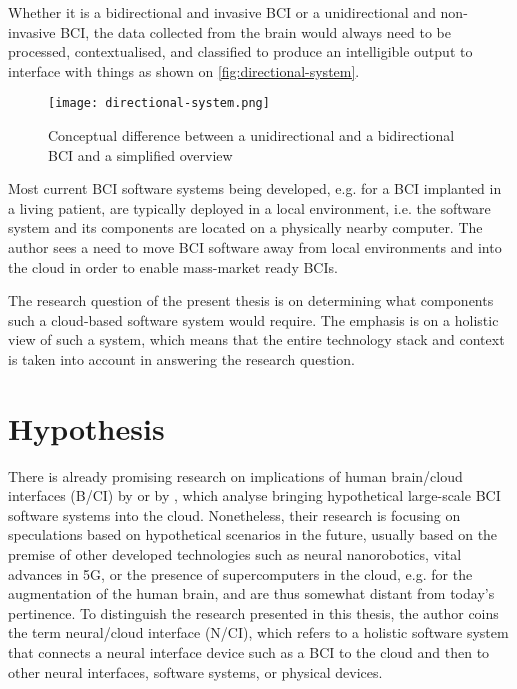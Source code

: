 Whether it is a bidirectional and invasive BCI or a unidirectional and non-invasive BCI, the data collected from the brain would always need to be processed, contextualised, and classified to produce an intelligible output to interface with things as shown on \autoref{fig:directional-system}.

\begin{figure}[ht]
  \centering
  \texttt{[image: directional-system.png]}
  \caption{Conceptual difference between a unidirectional and a bidirectional BCI and a simplified overview}
  \label{fig:directional-system}
\end{figure}

Most current BCI software systems being developed, e.g. for a BCI implanted in a living patient, are typically deployed in a local environment, i.e. the software system and its components are located on a physically nearby computer. The author sees a need to move BCI software away from local environments and into the cloud in order to enable mass-market ready BCIs.

The research question of the present thesis is on determining what components such a cloud-based software system would require. The emphasis is on a holistic view of such a system, which means that the entire technology stack and context is taken into account in answering the research question.

\section{Hypothesis}
\label{chapter1-hypothesis}

There is already promising research on implications of human brain/cloud interfaces (B/CI) by \citeauthor{martins_human_2019} \citeyearpar{martins_human_2019} or by \citeauthor{angelica_cognitive_2021} \citeyearpar{angelica_cognitive_2021}, which analyse bringing hypothetical large-scale BCI software systems into the cloud. Nonetheless, their research is focusing on speculations based on hypothetical scenarios in the future, usually based on the premise of other developed technologies such as neural nanorobotics, vital advances in 5G, or the presence of supercomputers in the cloud, e.g. for the augmentation of the human brain, and are thus somewhat distant from today's pertinence. To distinguish the research presented in this thesis, the author coins the term neural/cloud interface (N/CI), which refers to a holistic software system that connects a neural interface device such as a BCI to the cloud and then to other neural interfaces, software systems, or physical devices.

